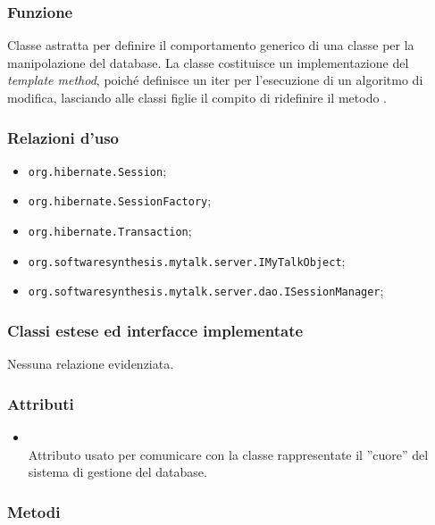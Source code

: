 
\subsubsection*{Funzione}
Classe astratta per definire il comportamento generico di una classe per la manipolazione del database. La classe costituisce un implementazione del \textit{template method}, poiché definisce un iter per l'esecuzione di un algoritmo di modifica, lasciando alle classi figlie il compito di ridefinire il metodo .

\subsubsection*{Relazioni d'uso}

\begin{itemize}
		\item \texttt{org.hibernate.Session};
		\item \texttt{org.hibernate.SessionFactory};
		\item \texttt{org.hibernate.Transaction};
		\item \texttt{org.softwaresynthesis.mytalk.server.IMyTalkObject};
		\item \texttt{org.softwaresynthesis.mytalk.server.dao.ISessionManager};
\end{itemize}

\subsubsection*{Classi estese ed interfacce implementate}

Nessuna relazione evidenziata.

\subsubsection*{Attributi}

\begin{itemize}
	\item{}\\
	Attributo usato per comunicare con la classe rappresentate il ''cuore'' del sistema di gestione del database.
\end{itemize}

\subsubsection*{Metodi}

